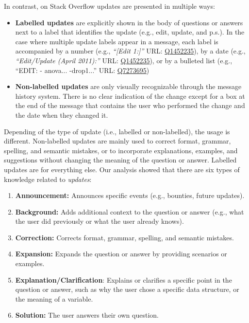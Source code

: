 \documentclass{sig-alternate-05-2015}
\begin{document}
	In contrast, on Stack Overflow updates are presented in multiple ways:
	\begin{itemize}
		\item \textbf{Labelled updates} are explicitly shown in the body of questions or answers next to a label that identifies the update (e.g., edit, update, and p.s.).
		In the case where multiple update labels appear in a message, each label is accompanied by a number (e.g., \textit{``[Edit 1:]''} {\footnotesize URL:  \href{http://goo.gl/ptYAG0}{Q1452235}}), by a date (e.g., \textit{``Edit/Update (April 2011):''} {\footnotesize URL:  \href{http://goo.gl/ptYAG0}{Q1452235}}), or by a bulleted list (e.g., ``EDIT: - anova... -drop1...'' {\footnotesize URL:  \href{http://goo.gl/sQiq0M}{Q7273695}})

		\item \textbf{Non-labelled updates} are only visually recognizable through the message history system. There is no clear indication of the change except for a box at the end of the message that contains the user who performed the change and the date when they changed it.
	\end{itemize}

	Depending of the type of update (i.e., labelled or non-labelled), the usage is different.
	Non-labelled updates are mainly used to correct format, grammar, spelling, and semantic mistakes, or to incorporate explanations, examples, and suggestions without changing the meaning of the question or answer. Labelled updates are for everything else.
	Our analysis showed that there are six types of knowledge related to \textit{updates}:
	\begin{enumerate}[\bfseries (1)]
		\item \textbf{Announcement:} Announces specific events (e.g., bounties, future updates).
		\item \textbf{Background:} Adds additional context to the question or answer (e.g., what the user did previously or what the user already knows).
		\item \textbf{Correction:} Corrects format, grammar, spelling, and semantic mistakes.
		\item \textbf{Expansion:} Expands the question or answer by providing scenarios or examples.
		\item \textbf{Explanation/Clarification}: Explains or clarifies a specific point in the question or answer, such as why the user chose a specific data structure, or the meaning of a variable.
		\item \textbf{Solution:} The user answers their own question.

	\end{enumerate}
\end{document}
